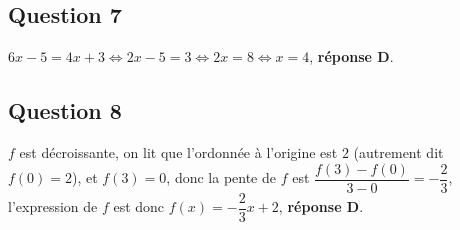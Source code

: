 \subsection*{Question 7}


%
\mbox{$6x-5=4x+3\iff 2x-5=3\iff2x=8\iff x=4$}, \textbf{réponse D}.
\subsection*{Question 8}
%
%
%
%
%

$f$ est décroissante, on lit que l'ordonnée à l'origine est $2$ (autrement dit \mbox{$f(0)=2$}), et \mbox{$f(3)=0$}, donc la pente de $f$ est \mbox{$\dfrac{f(3)-f(0)}{3-0}=-\dfrac23$}, l'expression de $f$ est donc \mbox{$f(x)=-\dfrac23 x +2$}, \textbf{réponse D}.
